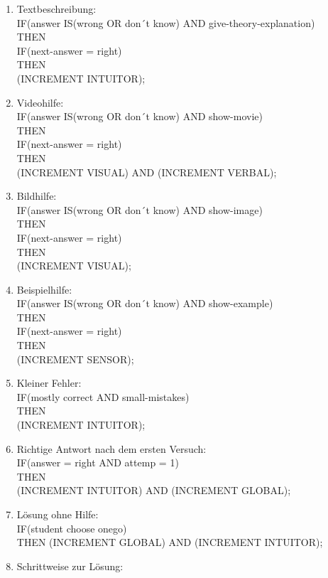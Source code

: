 \begingroup
  \footnotesize  
\begin{enumerate}  
  \item Textbeschreibung:\\
  IF(answer IS(wrong OR don´t know) AND give-theory-explanation)\\
  THEN \\
  IF(next-answer = right)\\
  THEN\\
  (INCREMENT INTUITOR);
  \item Videohilfe:\\
  IF(answer IS(wrong OR don´t know) AND show-movie)\\
  THEN\\
  IF(next-answer = right)\\
  THEN\\
  (INCREMENT VISUAL) AND (INCREMENT VERBAL);
  \item Bildhilfe:\\
  IF(answer IS(wrong OR don´t know) AND show-image)\\
  THEN\\
  IF(next-answer = right)\\
  THEN\\
  (INCREMENT VISUAL);
  \item Beispielhilfe:\\
  IF(answer IS(wrong OR don´t know) AND show-example)\\
  THEN\\
  IF(next-answer = right)\\
  THEN\\
  (INCREMENT SENSOR);
  \item Kleiner Fehler:\\
  IF(mostly correct AND small-mistakes)\\
  THEN\\
  (INCREMENT INTUITOR);
  \item Richtige Antwort nach dem ersten Versuch:\\
  IF(answer = right AND attemp = 1)\\
  THEN\\
  (INCREMENT INTUITOR) AND (INCREMENT GLOBAL);
  \item Lösung ohne Hilfe: \\ \label{RulesI}
  IF(student choose onego)\\
  THEN 
  (INCREMENT GLOBAL) AND  (INCREMENT INTUITOR);
  \item Schrittweise zur Lösung: \\

\end{enumerate}
